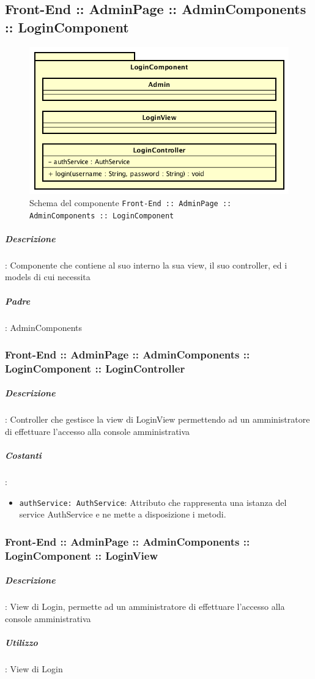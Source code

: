 \documentclass[../ManualeSviluppatore_v2.0.0.tex]{subfiles}
\begin{document}
\newpage
	\subsection{Front-End :: AdminPage :: AdminComponents :: LoginComponent}
	\begin{figure}[!h]
		\centering
		\includegraphics[scale=0.6]{Architettura/Front-End/AdminPage/AdminComponents/LoginComponent.png}
		\caption{Schema del componente \texttt{Front-End :: AdminPage :: AdminComponents :: LoginComponent}}
	\end{figure}
			\subparagraph{Descrizione}: Componente che contiene al suo interno la sua view, il suo controller, ed i models di cui necessita
			\subparagraph{Padre}: AdminComponents
			\subsubsection{Front-End :: AdminPage :: AdminComponents :: LoginComponent :: LoginController}
				\subparagraph{Descrizione}: Controller che gestisce la view di LoginView permettendo ad un amministratore di effettuare l'accesso alla console amministrativa
				\subparagraph{Costanti}:
				\begin{itemize}
					\item \texttt{authService: AuthService}: Attributo che rappresenta una istanza del service AuthService e ne mette a disposizione i metodi.
				\end{itemize}
	  		\subsubsection{Front-End :: AdminPage :: AdminComponents :: LoginComponent :: LoginView}
				\subparagraph{Descrizione}: View di Login, permette ad un amministratore di effettuare l'accesso alla console amministrativa
				\subparagraph{Utilizzo}: View di Login
\newpage
\end{document}
